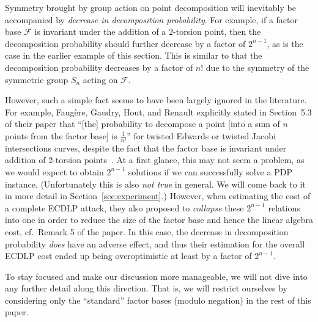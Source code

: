 Symmetry brought by group action on point decomposition will
inevitably be accompanied by \emph{decrease in decomposition
  probability}.
%
For example, if a factor base $\mathcal F$ is invariant under the
addition of a 2-torsion point, then the decomposition probability
should further decrease by a factor of $2^{n-1}$, as is the case in
the earlier example of this section.
%
This is similar to that the decomposition probability decreases by a
factor of $n!$ due to the symmetry of the symmetric group $S_n$ acting
on $\mathcal F$.

However, such a simple fact seems to have been largely ignored in the
literature.
%
For example, Faug\`ere, Gaudry, Hout, and Renault explicitly stated in
Section~5.3 of their paper that ``[the] probability to decompose a
point [into a sum of $n$ points from the factor base] is
$\frac{1}{n!}$'' for twisted Edwards or twisted Jacobi intersections
curves, despite the fact that the factor base is invariant under
addition of 2-torsion points~\cite{DBLP:journals/joc/FaugereGHR14}.
%
At a first glance, this may not seem a problem, as we would expect to
obtain $2^{n-1}$ solutions if we can successfully solve a PDP
instance.
%
(Unfortunately this is also \emph{not true} in general.  We will come
back to it in more detail in Section~\ref{sec:experiment}.)
% 
However, when estimating the cost of a complete ECDLP attack, they
also proposed to \emph{collapse} these $2^{n-1}$ relations into one in
order to reduce the size of the factor base and hence the linear
algebra cost, cf.~Remark 5 of the paper.
%
In this case, the decrease in decomposition probability \emph{does}
have an adverse effect, and thus their estimation for the overall
ECDLP cost ended up being overoptimistic at least by a factor of
$2^{n-1}$.

To stay focused and make our discussion more manageable, we will not
dive into any further detail along this direction.
%
That is, we will restrict ourselves by considering only the
``standard'' factor bases (modulo negation) in the rest of this paper.

